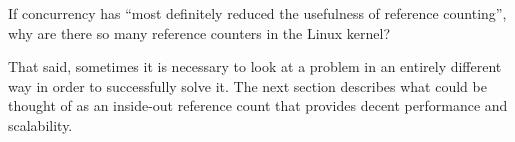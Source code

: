 \QuickQuiz{}
	If concurrency has ``most definitely reduced the usefulness
	of reference counting'', why are there so many reference
	counters in the Linux kernel?
 \QuickQuizEnd

That said, sometimes it is necessary to look at a problem in an
entirely different way in order to successfully solve it.
The next section describes what could be thought of as an
inside-out reference count that provides decent performance
and scalability.
